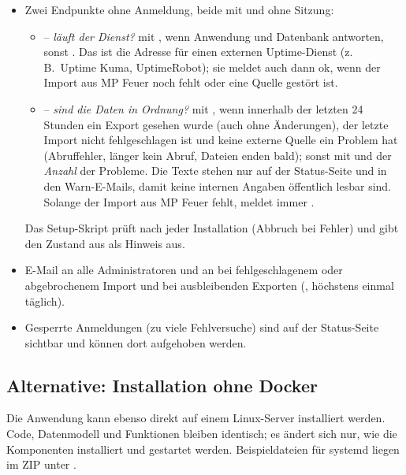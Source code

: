 \begin{itemize}
  \item Zwei Endpunkte ohne Anmeldung, beide mit  und ohne Sitzung:
    \begin{itemize}
      \item {} -- \emph{läuft der Dienst?}  mit
            , wenn Anwendung und Datenbank
            antworten, sonst . Das ist die Adresse für einen
            externen Uptime-Dienst (z.\,B.\ Uptime Kuma, UptimeRobot); sie
            meldet auch dann \glqq ok\grqq, wenn der Import aus MP Feuer noch
            fehlt oder eine Quelle gestört ist.
      \item {} -- \emph{sind die Daten in Ordnung?}  mit
            , wenn innerhalb
            der letzten 24 Stunden ein Export gesehen wurde (auch ohne
            Änderungen), der letzte Import nicht fehlgeschlagen ist und keine
            externe Quelle ein Problem hat (Abruffehler, länger kein Abruf,
            Dateien enden bald); sonst  mit 
            und der \emph{Anzahl} der Probleme. Die Texte stehen nur auf der
            Status-Seite und in den Warn-E-Mails, damit keine internen
            Angaben öffentlich lesbar sind. Solange der Import aus MP Feuer
            fehlt, meldet  immer .
    \end{itemize}
        Das Setup-Skript prüft nach jeder Installation 
        (Abbruch bei Fehler) und gibt den Zustand aus  als
        Hinweis aus.
  \item E-Mail an alle Administratoren und an 
        bei fehlgeschlagenem oder abgebrochenem Import und bei ausbleibenden
        Exporten (, höchstens einmal täglich).
  \item Gesperrte Anmeldungen (zu viele Fehlversuche) sind auf der
        Status-Seite sichtbar und können dort aufgehoben werden.
\end{itemize}

\subsection{Alternative: Installation ohne Docker}\label{sec:nodocker}

Die Anwendung kann ebenso direkt auf einem Linux-Server installiert werden.
Code, Datenmodell und Funktionen bleiben identisch; es ändert sich nur, wie
die Komponenten installiert und gestartet werden. Beispieldateien für
systemd liegen im ZIP unter .

